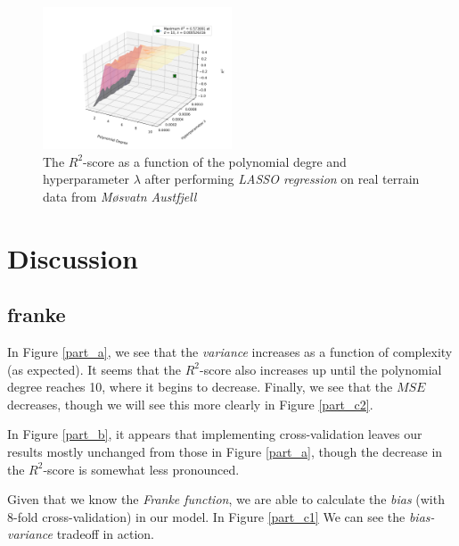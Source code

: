\documentclass[a4paper,10pt,english]{article}
\begin{document}
\begin{figure}[H]
	\centering 
	\includegraphics[width = 0.5\textwidth, center]{../real_output/part_E_3.png}
	\caption{The $R^2$-score as a function of the polynomial degre and hyperparameter $\lambda$ after performing \textit{LASSO regression} on real terrain data from \textit{Møsvatn Austfjell}}
	\label{part_g_e3}
\end{figure}

\section*{Discussion}
\label{sec:discussion}

\subsection*{franke}

In Figure \ref{part_a}, we see that the \textit{variance} increases as a function of complexity (as expected). It seems that the $R^2$-score also increases up until the polynomial degree reaches 10, where it begins to decrease.  Finally, we see that the $MSE$ decreases, though we will see this more clearly in Figure \ref{part_c2}.
 

In Figure \ref{part_b}, it appears that implementing cross-validation leaves our results mostly unchanged from those in Figure \ref{part_a}, though the decrease in the $R^2$-score is somewhat less pronounced.


Given that we know the \textit{Franke function}, we are able to calculate the \textit{bias} (with 8-fold cross-validation) in our model.  In Figure \ref{part_c1} We can see the \textit{bias-variance} tradeoff in action.  
\end{document}
